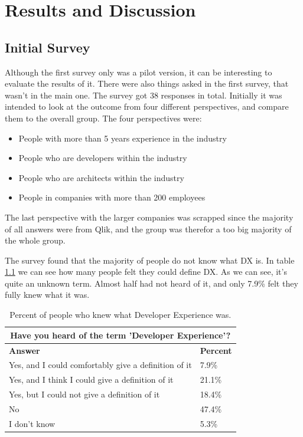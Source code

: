 \documentclass{cslthse-msc}
\begin{document}
    \chapter{Results and Discussion}

    \section{Initial Survey}
    Although the first survey only was a pilot version, it can be interesting to evaluate the results of it. There were also things asked in the first survey, that wasn't in the main one. The survey got 38 responses in total.
    Initially it was intended to look at the outcome from four different perspectives, and compare them to the overall group. The four perspectives were:
    \begin{itemize}[label={}]
        \item People with more than 5 years experience in the industry
        \item People who are developers within the industry
        \item People who are architects within the industry
        \item People in companies with more than 200 employees
    \end{itemize}
    The last perspective with the larger companies was
    scrapped since the majority of all answers were from Qlik, and the group
    was therefor a too big majority of the whole group.

    The survey found that the majority of people do not know what DX is. In table \ref{tab:knowdx} we can see how many people felt they could define DX. As we can see, it's quite an unknown term. Almost half had not heard of it, and only 7.9\% felt they fully knew what it was.

    \begin{table}[H]
        \centering
        \caption{Percent of people who knew what Developer Experience was.}
        \label{tab:knowdx}
        \begin{tabularx}{\columnwidth}{X|l}
            \multicolumn{2}{c}{\textbf{Have you heard of the term 'Developer Experience'?}} \\ \hline \hline
            \textbf{Answer} & \textbf{Percent} \\ \hline
            Yes, and I could comfortably give a definition of it & 7.9\%  \\ \hline
            Yes, and I think I could give a definition of it & 	21.1\%  \\ \hline
            Yes, but I could not give a definition of it &	18.4\%  \\ \hline
            No &	47.4\%  \\ \hline
            I don't know & 5.3\% \\ \hline
        \end{tabularx}
    \end{table}
\end{document}
